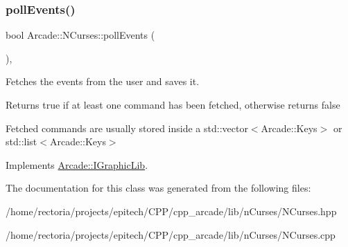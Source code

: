 \mbox{\label{class_arcade_1_1_n_curses_ae250fb39f3e256bef0492fd54ebdaee7}} 
\subsubsection{\texorpdfstring{poll\+Events()}{pollEvents()}}
{\footnotesize\ttfamily bool Arcade\+::\+N\+Curses\+::poll\+Events (\begin{DoxyParamCaption}{ }\end{DoxyParamCaption})\hspace{0.3cm}{\ttfamily [final]}, {\ttfamily [virtual]}}



Fetches the events from the user and saves it. 

\begin{DoxyReturn}{Returns}
true if at least one command has been fetched, otherwise returns false
\end{DoxyReturn}
Fetched commands are usually stored inside a std\+::vector$<$\+Arcade\+::\+Keys$>$ or std\+::list$<$\+Arcade\+::\+Keys$>$ 

Implements \hyperlink{class_arcade_1_1_i_graphic_lib_a6be852f0395f08943f988c6823b80937}{Arcade\+::\+I\+Graphic\+Lib}.



The documentation for this class was generated from the following files\+:\begin{DoxyCompactItemize}
\item 
/home/rectoria/projects/epitech/\+C\+P\+P/cpp\+\_\+arcade/lib/n\+Curses/N\+Curses.\+hpp\item 
/home/rectoria/projects/epitech/\+C\+P\+P/cpp\+\_\+arcade/lib/n\+Curses/N\+Curses.\+cpp\end{DoxyCompactItemize}
